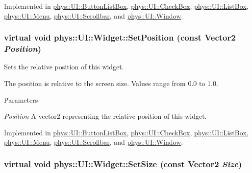 Implemented in \hyperlink{classphys_1_1UI_1_1ButtonListBox_a4a04ebc31c875cd0648f1f2882249635}{phys::UI::ButtonListBox}, \hyperlink{classphys_1_1UI_1_1CheckBox_ae60f9f812d4b19e79fd782dad88a2084}{phys::UI::CheckBox}, \hyperlink{classphys_1_1UI_1_1ListBox_abb26f02d8ab44b9ebd6add14a9ba809c}{phys::UI::ListBox}, \hyperlink{classphys_1_1UI_1_1Menu_a9bbb3c347fa49cb0f3cbe50293966cf3}{phys::UI::Menu}, \hyperlink{classphys_1_1UI_1_1Scrollbar_ae21108cb65871ba59da2984542eab1a1}{phys::UI::Scrollbar}, and \hyperlink{classphys_1_1UI_1_1Window_a1b9832e05d8c15a30a2ac12cc1ebb255}{phys::UI::Window}.

\hypertarget{classphys_1_1UI_1_1Widget_a3f1cd1ce55660c7de4859983bac1ab7c}{
\subsubsection[{SetPosition}]{\setlength{\rightskip}{0pt plus 5cm}virtual void phys::UI::Widget::SetPosition (const {\bf Vector2} {\em Position})}}
\label{d9/d48/classphys_1_1UI_1_1Widget_a3f1cd1ce55660c7de4859983bac1ab7c}


Sets the relative position of this widget. 

The position is relative to the screen size. Values range from 0.0 to 1.0. 
\begin{DoxyParams}{Parameters}
\item[{\em Position}]A vector2 representing the relative position of this widget. \end{DoxyParams}


Implemented in \hyperlink{classphys_1_1UI_1_1ButtonListBox_a84dcb7e5d9f03ff69a10a75eec88cb1e}{phys::UI::ButtonListBox}, \hyperlink{classphys_1_1UI_1_1CheckBox_ac71d4b2b748ff00c723e36b35dfce3ec}{phys::UI::CheckBox}, \hyperlink{classphys_1_1UI_1_1ListBox_ac7e4d02b6be093bd31f9904d6c0ef88f}{phys::UI::ListBox}, \hyperlink{classphys_1_1UI_1_1Menu_afb571168819d4c78678d7a195e54b389}{phys::UI::Menu}, \hyperlink{classphys_1_1UI_1_1Scrollbar_a6a61740b90f640463fff1ebe46ca68e9}{phys::UI::Scrollbar}, and \hyperlink{classphys_1_1UI_1_1Window_a66babe97151763b445e8920c5c231985}{phys::UI::Window}.

\hypertarget{classphys_1_1UI_1_1Widget_a3fe0b767fea59e1d120ed37b26c99044}{
\subsubsection[{SetSize}]{\setlength{\rightskip}{0pt plus 5cm}virtual void phys::UI::Widget::SetSize (const {\bf Vector2} {\em Size})}}
\label{d9/d48/classphys_1_1UI_1_1Widget_a3fe0b767fea59e1d120ed37b26c99044}


